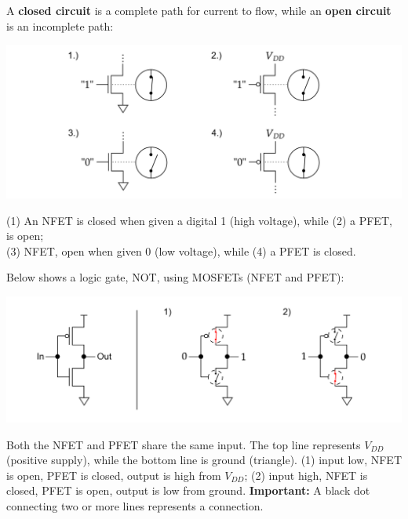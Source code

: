 \noindent
\begin{Def}

  \label{def:open_closed_circuits}

  A \textbf{closed circuit} is a complete path for current to flow, while an \textbf{open circuit} is an incomplete path:

  \begin{center}
  \includegraphics[width=\textwidth]{Sections/circuits/open_closed.png}
  \end{center}

  \noindent
  (1) An NFET is closed when given a digital 1 (high voltage), while (2) a PFET, is open;\\
  (3) NFET, open when given 0 (low voltage), while (4) a PFET is closed.
\end{Def}

\begin{Def}

  \label{def:mosfet_logic_gate_not}

  Below shows a logic gate, NOT, using MOSFETs (NFET and PFET):

  \begin{center}
  \includegraphics[width=\textwidth]{Sections/circuits/not.png}
  \end{center}

  \noindent
  Both the NFET and PFET share the same input. The top line represents $V_{DD}$ (positive supply), while the bottom line is ground (triangle).
  (1) input low, NFET is open, PFET is closed, output is high from $V_{DD}$; (2) input high, NFET is closed, PFET is open, output is low from ground.
  \textbf{Important:} A black dot connecting two or more lines represents a connection.
\end{Def}


